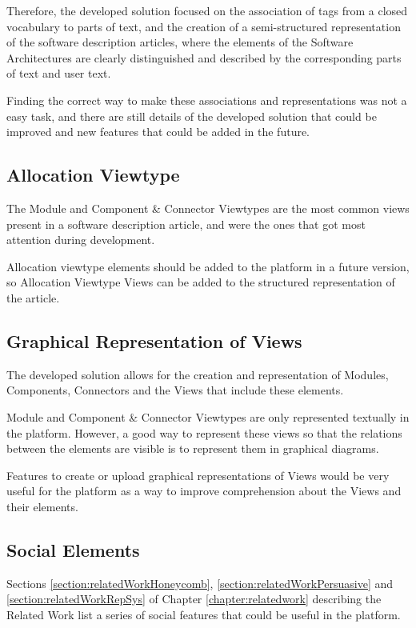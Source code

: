 \documentclass{llncs}
\begin{document}
Therefore, the developed solution focused on the association of tags from a closed vocabulary to parts of text, and the creation of a semi-structured representation of the software description articles, where the elements of the Software Architectures are clearly distinguished and described by the corresponding parts of text and user text.

Finding the correct way to make these associations and representations was not a easy task, and there are still details of the developed solution that could be improved and new features that could be added in the future.

\subsection{Allocation Viewtype}

The Module and Component \& Connector Viewtypes are the most common views present in a software description article, and were the ones that got most attention during development.

Allocation viewtype elements should be added to the platform in a future version, so Allocation Viewtype Views can be added to the structured representation of the article.

\subsection{Graphical Representation of Views}

The developed solution allows for the creation and representation of Modules, Components, Connectors and the Views that include these elements. 

Module and Component \& Connector Viewtypes are only represented textually in the platform. However, a good way to represent these views so that the relations between the elements are visible is to represent them in graphical diagrams. 

Features to create or upload graphical representations of Views would be very useful for the platform as a way to improve comprehension about the Views and their elements.

\subsection{Social Elements}

Sections \ref{section:relatedWorkHoneycomb}, \ref{section:relatedWorkPersuasive} and  \ref{section:relatedWorkRepSys} of Chapter \ref{chapter:relatedwork} describing the Related Work list a series of social features that could be useful in the platform.
\end{document}

